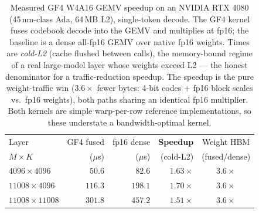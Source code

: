 \begin{table}[t]
  \centering
  \caption{Measured GF4 W4A16 GEMV speedup on an NVIDIA RTX 4080 (45\,nm-class
  Ada, 64\,MB L2), single-token decode. The GF4 kernel fuses codebook decode
  into the GEMV and multiplies at fp16; the baseline is a dense all-fp16 GEMV
  over native fp16 weights. Times are \emph{cold-L2} (cache flushed between
  calls), the memory-bound regime of a real large-model layer whose weights
  exceed L2 --- the honest denominator for a traffic-reduction speedup. The
  speedup is the pure weight-traffic win ($3.6\times$ fewer bytes: 4-bit codes
  $+$ fp16 block scales vs.\ fp16 weights), both paths sharing an identical fp16
  multiplier. Both kernels are simple warp-per-row reference implementations, so
  these understate a bandwidth-optimal kernel.}
  \label{tab:cuda-speedup}
  \small
  \begin{tabular}{lrrrc}
    \toprule
    Layer & GF4 fused & fp16 dense & \textbf{Speedup} & Weight HBM \\
    $M\times K$ & ($\mu$s) & ($\mu$s) & (cold-L2) & (fused/dense) \\
    \midrule
    $4096\times4096$    & $50.6$  & $82.6$  & $\mathbf{1.63\times}$ & $3.6\times$ \\
    $11008\times4096$   & $116.3$ & $198.1$ & $\mathbf{1.70\times}$ & $3.6\times$ \\
    $11008\times11008$  & $301.8$ & $457.2$ & $\mathbf{1.51\times}$ & $3.6\times$ \\
    \bottomrule
  \end{tabular}
\end{table}
